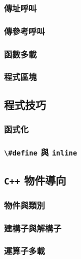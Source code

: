 \documentclass[12pt,a4paper,oneside]{article}
\begin{document}
\begin{CJK}{UTF8}{bkai}
\subsubsection{傳址呼叫}
\subsubsection{傳參考呼叫}
\subsubsection{函數多載}
\subsubsection{程式區塊}

\subsection{程式技巧}
\subsubsection{函式化}
\subsubsection{\lstinline!\#define! 與 \lstinline!inline!}

\subsection{\texttt{C++} 物件導向}
\subsubsection{物件與類別}
\subsubsection{建構子與解構子}
\subsubsection{運算子多載}

\ifx \allfiles \undefined

\printindex

\clearpage
\end{CJK}
\end{document}
